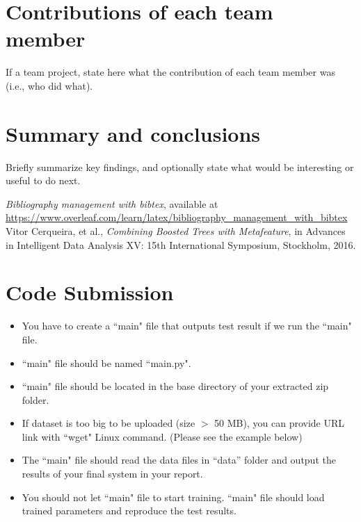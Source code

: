 \documentclass[singlecolumn]{article}
\begin{document}
\section{Contributions of each team member}
If a team project, state here what the contribution of each team member was (i.e., who did what). 

\section{Summary and conclusions}
Briefly summarize key findings, and optionally state what would be interesting or useful to do next.



\begin{thebibliography}{2}
	 \textit{Bibliography management with bibtex}, available at \url{https://www.overleaf.com/learn/latex/bibliography_management_with_bibtex}
	 Vitor Cerqueira, et al., \textit{Combining Boosted Trees with Metafeature}, in Advances in Intelligent Data Analysis XV: 15th International Symposium, Stockholm, 2016.
\end{thebibliography}

%

\appendix
\section{Code Submission}
\begin{itemize}
	\item You have to create a ``main" file that outputs test result if we run the ``main" file.
	\item ``main" file should be named ``main.py".
	\item ``main" file should be located in the base directory of your extracted zip folder.
	\item If dataset  is too big to be uploaded (size $>$ 50 MB), you can provide URL link with ``wget" Linux command. (Please see the example below)
	\item The ``main" file should read the data files in “data” folder and output the results of your final system in your report. 
	\item You should not let ``main" file to start training. ``main" file should load trained parameters and reproduce the test results.
\end{itemize}
\end{document}
